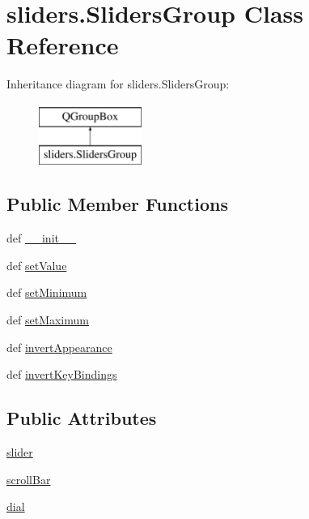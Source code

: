 \hypertarget{classsliders_1_1SlidersGroup}{}\section{sliders.\+Sliders\+Group Class Reference}
\label{classsliders_1_1SlidersGroup}
Inheritance diagram for sliders.\+Sliders\+Group\+:\begin{figure}[H]
\begin{center}
\leavevmode
\includegraphics[height=2.000000cm]{classsliders_1_1SlidersGroup}
\end{center}
\end{figure}
\subsection*{Public Member Functions}
\begin{DoxyCompactItemize}
\item 
def \hyperlink{classsliders_1_1SlidersGroup_ab360100437c1715ef629e03fe1e9e423}{\+\_\+\+\_\+init\+\_\+\+\_\+}
\item 
def \hyperlink{classsliders_1_1SlidersGroup_af930e45d2e174af21bc7c1c55747c450}{set\+Value}
\item 
def \hyperlink{classsliders_1_1SlidersGroup_abd0dc2dccabe571fc457da9cf941cc6c}{set\+Minimum}
\item 
def \hyperlink{classsliders_1_1SlidersGroup_a6c67aa489e175a11309d7ebf56c59507}{set\+Maximum}
\item 
def \hyperlink{classsliders_1_1SlidersGroup_aea7b8461a4f7be37a67503d791f2f396}{invert\+Appearance}
\item 
def \hyperlink{classsliders_1_1SlidersGroup_ad39e0c882e51f27220ec0b6bd554713d}{invert\+Key\+Bindings}
\end{DoxyCompactItemize}
\subsection*{Public Attributes}
\begin{DoxyCompactItemize}
\item 
\hyperlink{classsliders_1_1SlidersGroup_a596391f24859b01ee0a3911abb3a861e}{slider}
\item 
\hyperlink{classsliders_1_1SlidersGroup_af25ba51b8517930c7f01214b0c2b2cbf}{scroll\+Bar}
\item 
\hyperlink{classsliders_1_1SlidersGroup_a64311b15815e98518d44ff9a251e607d}{dial}
\end{DoxyCompactItemize}
